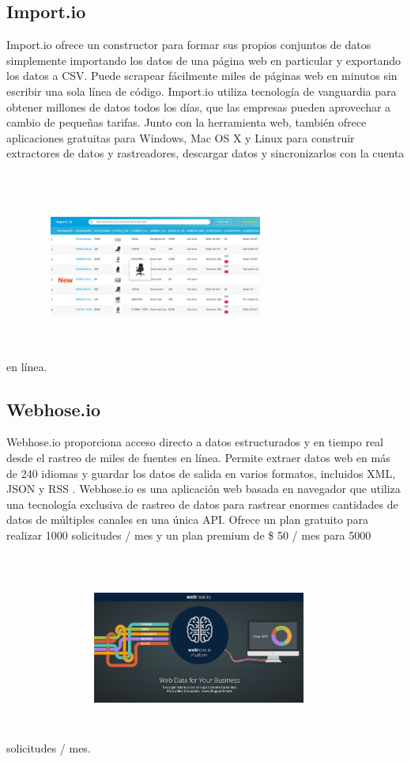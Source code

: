 \documentclass[twoside,twocolumn]{article}
\begin{document}
\subsection{Import.io}
Import.io ofrece un constructor para formar sus propios conjuntos de datos simplemente importando los datos de una página web en particular y exportando los datos a CSV. Puede scrapear fácilmente miles de páginas web en minutos sin escribir una sola línea de código.
Import.io utiliza tecnología de vanguardia para obtener millones de datos todos los días, que las empresas pueden aprovechar a cambio de pequeñas tarifas. Junto con la herramienta web, también ofrece aplicaciones gratuitas para Windows, Mac OS X y Linux para construir extractores de datos y rastreadores, descargar datos y sincronizarlos con la cuenta en línea.
\includegraphics[width=7cm, height=7cm]{imagenes/2.png}


\subsection{Webhose.io}
Webhose.io proporciona acceso directo a datos estructurados y en tiempo real desde 
el rastreo de miles de fuentes en línea. Permite extraer datos web en más de 240 idiomas
 y guardar los datos de salida en varios formatos, incluidos XML, JSON y RSS .
Webhose.io es una aplicación web basada en navegador que utiliza una tecnología
 exclusiva de rastreo de datos para rastrear enormes cantidades de datos de múltiples canales en una única API. Ofrece un plan gratuito para realizar 1000 solicitudes /
 mes y un plan premium de \$ 50 / mes para 5000 solicitudes / mes.
 \includegraphics[width=7cm, height=7cm]{imagenes/3.png}
\end{document}
